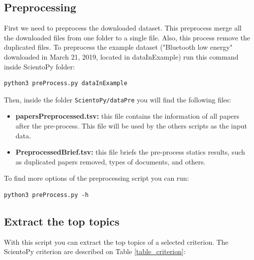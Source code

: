 \documentclass[10pt,letterpaper]{article}
\begin{document}
\subsection{Preprocessing}

First we need to preprocess the downloaded dataset. This preprocess merge all the downloaded files from one folder to a single file. Also, this process remove the duplicated files. To preprocess the example dataset ("Bluetooth low energy"  downloaded in March 21, 2019, located in dataInExample) run this command inside ScientoPy folder: 
\begin{verbatim}
python3 preProcess.py dataInExample
\end{verbatim}

Then, inside the folder \verb|ScientoPy/dataPre| you will find the following files: 
\begin{itemize}
\item \textbf{papersPreprocessed.tsv:} this file contains the information of all papers after the pre-process. This file will be used by the others scripts as the input data. 
\item \textbf{PreprocessedBrief.tsv:} this file briefs the pre-process statics results, such as duplicated papers removed, types of documents, and others. 
\end{itemize}

To find more options of the preprocessing script you can run:
\begin{verbatim}
python3 preProcess.py -h
\end{verbatim}

\subsection{Extract the top topics}

With this script you can extract the top topics of a selected criterion. The ScientoPy criterion are described on Table \ref{table_criterion}:
\end{document}
